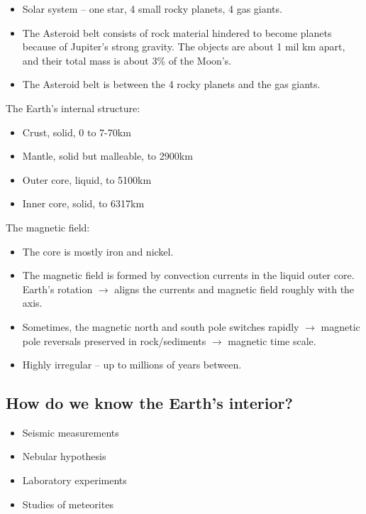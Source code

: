 \begin{itemize}
    \item Solar system -- one star, 4 small rocky planets, 4 gas giants.
    \item The Asteroid belt consists of rock material hindered to become
        planets because of Jupiter's strong gravity. The objects are about
        1 mil km apart, and their total mass is about 3\% of the Moon's.
    \item The Asteroid belt is between the 4 rocky planets and the gas giants.
\end{itemize}

The Earth's internal structure:
\begin{itemize}
    \item Crust, solid, 0 to 7-70km
    \item Mantle, solid but malleable, to 2900km
    \item Outer core, liquid, to 5100km
    \item Inner core, solid, to 6317km
\end{itemize}

The magnetic field:
\begin{itemize}
    \item The core is mostly iron and nickel.
    \item The magnetic field is formed by convection currents in the liquid
        outer core. Earth's rotation $\rightarrow$ aligns the currents and
        magnetic field roughly with the axis.
    \item Sometimes, the magnetic north and south pole switches rapidly
        $\rightarrow$ magnetic pole reversals preserved in rock/sediments
        $\rightarrow$ magnetic time scale.
    \item Highly irregular -- up to millions of years between.
\end{itemize}

\subsection{How do we know the Earth's interior?}
\begin{itemize}
    \item Seismic measurements
    \item Nebular hypothesis
    \item Laboratory experiments
    \item Studies of meteorites
\end{itemize}

